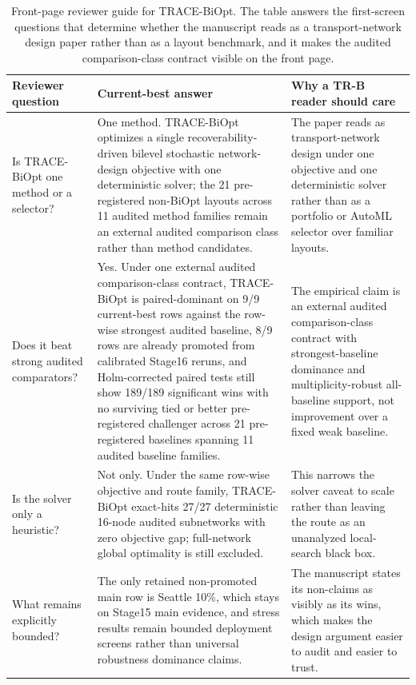 \begin{table}[pos=htbp]
\centering
\caption{Front-page reviewer guide for TRACE-BiOpt. The table answers the first-screen questions that determine whether the manuscript reads as a transport-network design paper rather than as a layout benchmark, and it makes the audited comparison-class contract visible on the front page.}
\label{tab:trace-biopt-reader-guide}
\small
\begin{tabularx}{\textwidth}{>{\raggedright\arraybackslash}p{}>{\raggedright\arraybackslash}p{}>{\raggedright\arraybackslash}X}
\toprule
Reviewer question & Current-best answer & Why a TR-B reader should care \\
\midrule
Is TRACE-BiOpt one method or a selector? & One method. TRACE-BiOpt optimizes a single recoverability-driven bilevel stochastic network-design objective with one deterministic solver; the 21 pre-registered non-BiOpt layouts across 11 audited method families remain an external audited comparison class rather than method candidates. & The paper reads as transport-network design under one objective and one deterministic solver rather than as a portfolio or AutoML selector over familiar layouts. \\
Does it beat strong audited comparators? & Yes. Under one external audited comparison-class contract, TRACE-BiOpt is paired-dominant on 9/9 current-best rows against the row-wise strongest audited baseline, 8/9 rows are already promoted from calibrated Stage16 reruns, and Holm-corrected paired tests still show 189/189 significant wins with no surviving tied or better pre-registered challenger across 21 pre-registered baselines spanning 11 audited baseline families. & The empirical claim is an external audited comparison-class contract with strongest-baseline dominance and multiplicity-robust all-baseline support, not improvement over a fixed weak baseline. \\
Is the solver only a heuristic? & Not only. Under the same row-wise objective and route family, TRACE-BiOpt exact-hits 27/27 deterministic 16-node audited subnetworks with zero objective gap; full-network global optimality is still excluded. & This narrows the solver caveat to scale rather than leaving the route as an unanalyzed local-search black box. \\
What remains explicitly bounded? & The only retained non-promoted main row is Seattle 10\%, which stays on Stage15 main evidence, and stress results remain bounded deployment screens rather than universal robustness dominance claims. & The manuscript states its non-claims as visibly as its wins, which makes the design argument easier to audit and easier to trust. \\
\bottomrule
\end{tabularx}
\end{table}
